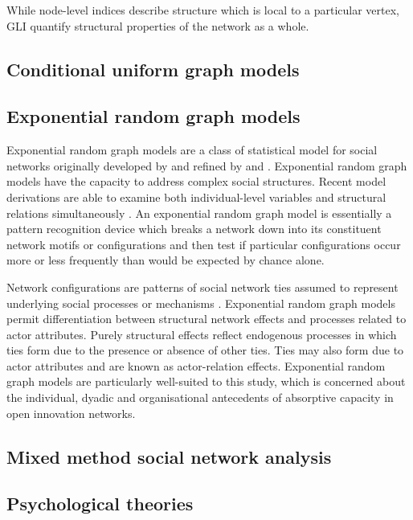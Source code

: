 While node-level indices describe structure which is local to a particular vertex, GLI quantify structural properties of the network as a whole.


\subsection{Conditional uniform graph models}



\subsection{Exponential random graph models}

Exponential random graph models are a class of statistical model for social networks originally developed by \citet{frank1986markov} and refined by \citet{wasserman1996logit} and \citet{pattison1999logit}. Exponential random graph models have the capacity to address complex social structures. Recent model derivations are able to examine both individual-level variables and structural relations simultaneously \citep{robins2007recent}. An exponential random graph model is essentially a pattern recognition device which breaks a network down into its constituent network motifs or configurations and then test if particular configurations occur more or less frequently than would be expected by chance alone. \medskip

Network configurations are patterns of social network ties assumed to represent underlying social processes or mechanisms \citep{lusher2014cooperative}. Exponential random graph models permit differentiation between structural network effects and processes related to actor attributes. Purely structural effects reflect endogenous processes in which ties form due to the presence or absence of other ties. Ties may also form due to actor attributes and are known as actor-relation effects. Exponential random graph models are particularly well-suited to this study, which is concerned about the individual, dyadic and organisational antecedents of absorptive capacity in open innovation networks.


\subsection{Mixed method social network analysis}



\subsection{Psychological theories}

